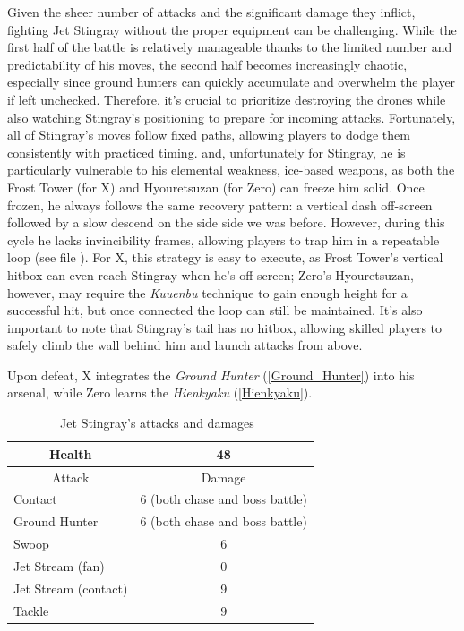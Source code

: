 Given the sheer number of attacks and the significant damage they inflict, fighting Jet Stingray without the proper equipment can be challenging. While the first half of the battle is relatively manageable thanks to the limited number and predictability of his moves, the second half becomes increasingly chaotic, especially since ground hunters can quickly accumulate and overwhelm the player if left unchecked. Therefore, it’s crucial to prioritize destroying the drones while also watching Stingray's positioning to prepare for incoming attacks. Fortunately, all of Stingray's moves follow fixed paths, allowing players to dodge them consistently with practiced timing. and, unfortunately for Stingray, he is particularly vulnerable to his elemental weakness, ice-based weapons, as both the Frost Tower (for X) and Hyouretsuzan (for Zero) can freeze him solid. Once frozen, he always follows the same recovery pattern: a vertical dash off-screen followed by a slow descend on the side side we was before. However, during this cycle he lacks invincibility frames, allowing players to trap him in a repeatable loop (see file ). For X, this strategy is easy to execute, as Frost Tower’s vertical hitbox can even reach Stingray when he's off-screen; Zero's Hyouretsuzan, however, may require the \emph{Kuuenbu} technique to gain enough height for a successful hit, but once connected the loop can still be maintained. It's also important to note that Stingray's tail has no hitbox, allowing skilled players to safely climb the wall behind him and launch attacks from above.

Upon defeat, X integrates the \emph{Ground Hunter} (\ref{Ground_Hunter}) into his arsenal, while Zero learns the \emph{Hienkyaku} (\ref{Hienkyaku}).

\begin{table}[htp]
	\centering
	\begin{tabular}[h]{l c}
		\toprule
		\multicolumn{1}{c}{Health}  & 48\\
		\midrule
		\multicolumn{1}{c}{Attack} & \multicolumn{1}{c}{Damage}\\
		Contact & 6 (both chase and boss battle) \\
		Ground Hunter& 6 (both chase and boss battle)\\
		Swoop & 6\\
		Jet Stream (fan)& 0 \\
		Jet Stream (contact)& 9 \\
		Tackle & 9\\
		\bottomrule
	\end{tabular}
	\caption{Jet Stingray's attacks and damages~\cite{book:Compendium,wiki:Jet_stingray}}
\end{table}

